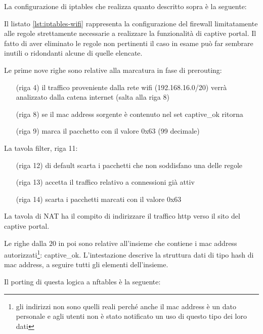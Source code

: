 La configurazione di iptables che realizza quanto descritto sopra è la
seguente:

\begin{minipage}{\linewidth}

\end{minipage}

\noindent Il listato \ref{lst:iptables-wifi} rappresenta la configurazione del
firewall limitatamente alle regole strettamente necessarie a realizzare la
funzionalità di captive portal. Il fatto di aver eliminato le regole non
pertinenti il caso in esame può far sembrare inutili o ridondanti alcune di
quelle elencate.

Le prime nove righe sono relative alla marcatura in fase di prerouting:
\begin{itemize}[itemindent=2em]
    \item[(riga 4)] il traffico proveniente dalla rete wifi (192.168.16.0/20)
    verrà analizzato dalla catena internet (salta alla riga 8)
    \item[(riga 8)] se il mac address sorgente è contenuto nel set captive\_ok
    ritorna
      \item[(riga 9)] marca il pacchetto con il valore 0x63 (99 decimale)
  \end{itemize}
  La tavola filter, riga 11:
  \begin{itemize}[itemindent=2em]
      \item[(riga 12)] di default scarta i pacchetti che non soddisfano una delle regole
      \item[(riga 13)] accetta il traffico relativo a connessioni già attiv
      \item[(riga 14)] scarta i pacchetti marcati con il valore 0x63
\end{itemize}
La tavola di NAT ha il compito di indirizzare il traffico http verso il sito
del captive portal.

Le righe dalla $20$ in poi sono relative all'insieme che contiene i mac
address autorizzati\footnote{gli indirizzi non sono quelli reali perché anche
il mac address è un dato personale e agli utenti non è stato notificato un uso
di questo tipo dei loro dati}: captive\_ok.
L'intestazione descrive la struttura dati di tipo hash di mac address, a
seguire tutti gli elementi dell'insieme.

Il porting di questa logica a nftables è la seguente:




